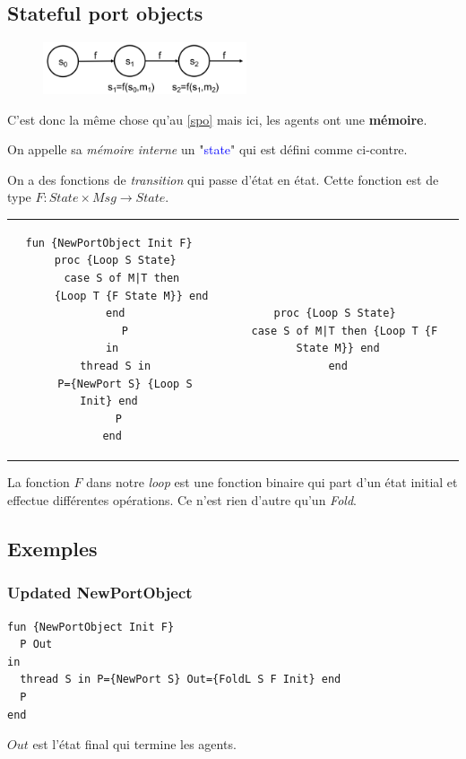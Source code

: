 \documentclass{report}
\begin{document}
\subsection{Stateful port objects}
\begin{figure}
\centering
\includegraphics[width=6cm]{img/statefulPortObject.png}
\end{figure}
C'est donc la même chose qu'au \ref{spo} mais ici, les agents ont une \textbf{mémoire}.\par 
On appelle sa \textit{mémoire interne} un "\textcolor{blue}{state}" qui est défini comme ci-contre.\par 
On a des fonctions de \textit{transition} qui passe d'état en état. Cette fonction est de type $F	: State \times Msg \longrightarrow State$.
\begin{center}
\begin{tabular}{c|c}
\begin{lstlisting}[escapechar=\%]
fun {NewPortObject Init F} 
  proc {Loop S State} 
    case S of M|T then 
      {Loop T {F State M}} end
  end 
    P
in
  thread S in 
    P={NewPort S} {Loop S Init} end 
  P
end
\end{lstlisting} & \begin{lstlisting}[escapechar=\%]
proc {Loop S State} 
  case S of M|T then {Loop T {F State M}} end
end
\end{lstlisting}
\end{tabular}
\end{center}
La fonction $F$ dans notre \textit{loop} est une fonction binaire qui part d'un état initial et effectue différentes opérations. Ce n'est rien d'autre qu'un \textit{Fold}.

\subsection{Exemples}
\subsubsection{Updated NewPortObject}
\begin{lstlisting}[escapechar=\%]
fun {NewPortObject Init F} 
  P Out
in
  thread S in P={NewPort S} Out={FoldL S F Init} end 
  P
end
\end{lstlisting}
$Out$ est l'état final qui termine les agents.
\end{document}
